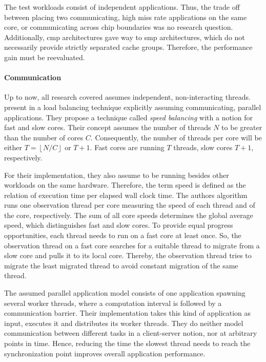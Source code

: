 The test workloads consist of independent applications.
Thus, the trade off between placing two communicating, high miss rate
applications on the same core, or communicating across chip boundaries was no
research question.
Additionally, \gls{cmp} architectures gave way to \gls{smp} architectures,
which do not necessarily provide strictly separated cache groups.
Therefore, the performance gain must be reevaluated.
\\

\paragraph{Communication}
Up to now, all research covered assumes independent, non-interacting threads.
\citeauthor{hofmeyr_load_2010} present in \cite{hofmeyr_load_2010} a load
balancing technique explicitly assuming communicating, parallel applications.
They propose a technique called \emph{speed balancing} with a notion for fast
and slow cores.
Their concept assumes the number of threads $N$ to be greater than the number of
cores $C$.
Consequently, the number of threads per core will be either
$T = \left \lfloor{N/C}\right \rfloor$ or $T+1$.
Fast cores are running $T$ threads, slow cores $T+1$, respectively.

For their implementation, they also assume to be running besides other
workloads on the same hardware.
Therefore, the term speed is defined as the relation of execution time per
elapsed wall clock time.
The authors algorithm runs one observation thread per core measuring the speed
of each thread and of the core, respectively.
The sum of all core speeds determines the global average speed, which
distinguishes fast and slow cores.
To provide equal progress opportunities, each thread needs to run on a fast
core at least once.
So, the observation thread on a fast core searches for a suitable thread to
migrate from a slow core and pulls it to its local core.
Thereby, the observation thread tries to migrate the least migrated thread to
avoid constant migration of the same thread.

The assumed parallel application model consists of one application
spawning several worker threads, where a computation interval is followed by a
communication barrier.
Their implementation takes this kind of application as input, executes it and
distributes its worker threads.
They do neither model communication between different tasks in a client-server
notion, nor at arbitrary points in time.
Hence, reducing the time the slowest thread needs to reach the synchronization
point improves overall application performance.
\\

